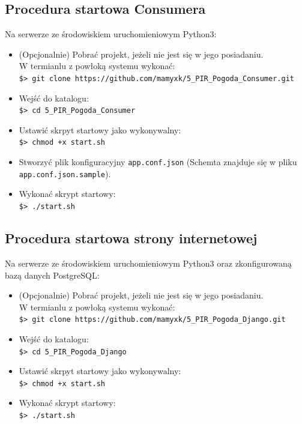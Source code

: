 \documentclass[12pt,a4paper]{article}
\begin{document}
    \subsection{Procedura startowa Consumera}
    Na serwerze ze środowiskiem uruchomieniowym Python3:
    \begin{itemize}
        \item (Opcjonalnie) Pobrać projekt, jeżeli nie jest się w jego posiadaniu. \\ W termianlu z powłoką systemu wykonać:\\ \texttt{\$> git clone https://github.com/mamyxk/5\_PIR\_Pogoda\_Consumer.git}
        \item Wejść do katalogu: \\\texttt{\$> cd 5\_PIR\_Pogoda\_Consumer}
        \item Ustawić skrpyt startowy jako wykonywalny:\\ \texttt{\$> chmod +x start.sh}
        \item Stworzyć plik konfiguracyjny \texttt{app.conf.json} (Schemta znajduje się w pliku \texttt{app.conf.json.sample}).
        \item Wykonać skrypt startowy: \\ \texttt{\$> ./start.sh}
    \end{itemize}

    \subsection{Procedura startowa strony internetowej}
    Na serwerze ze środowiskiem uruchomieniowym Python3 oraz zkonfigurowaną bazą danych PostgreSQL:
    \begin{itemize}
        \item (Opcjonalnie) Pobrać projekt, jeżeli nie jest się w jego posiadaniu. \\ W termianlu z powłoką systemu wykonać:\\ \texttt{\$> git clone https://github.com/mamyxk/5\_PIR\_Pogoda\_Django.git}
        \item Wejść do katalogu: \\\texttt{\$> cd 5\_PIR\_Pogoda\_Django}
        \item Ustawić skrpyt startowy jako wykonywalny:\\ \texttt{\$> chmod +x start.sh}
        \item Wykonać skrypt startowy: \\ \texttt{\$> ./start.sh}
    \end{itemize}
\end{document}
